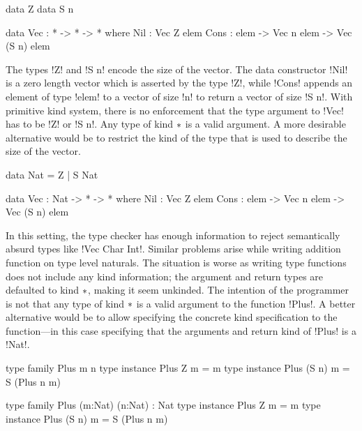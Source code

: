 \documentclass[manuscript,screen,nonacm]{acmart}
\begin{document}
\begin{minipage}[ht]{0.4\linewidth}
  \begin{code}
    data Z
    data S n
  \end{code}
\end{minipage}%
\begin{minipage}[ht]{0.4\linewidth}
\begin{code}
  data Vec : * -> * -> * where
      Nil  : Vec Z elem
      Cons : elem -> Vec n elem -> Vec (S n) elem
\end{code}
\end{minipage}

The types !Z! and !S n! encode the size of the vector. The data constructor !Nil! is a zero length vector which is asserted by the type !Z!, while !Cons! appends an element of type !elem! to a vector of size !n! to return a vector of size !S n!. With primitive kind system, there is no enforcement that the type argument to !Vec! has to be !Z! or !S n!. Any type of kind $\ast$ is a valid argument. A more desirable alternative would be to restrict the kind of the type that is used to describe the size of the vector.

\begin{minipage}[ht]{0.4\linewidth}
  \begin{code}
    data Nat = Z
             | S Nat
  \end{code}
\end{minipage}%
\begin{minipage}[ht]{0.4\linewidth}
\begin{code}
  data Vec : Nat -> * -> * where
      Nil  : Vec Z elem
      Cons : elem -> Vec n elem -> Vec (S n) elem
\end{code}
\end{minipage}

In this setting, the type checker has enough information to reject semantically absurd types like !Vec Char Int!.
Similar problems arise while writing addition function on type level naturals. The situation is worse as writing type functions does not include any kind information; the argument and return types are defaulted to kind $\ast$, making it seem unkinded. The intention of the programmer is not that any type of kind $\ast$ is a valid argument to the function !Plus!. A better alternative would be to allow specifying the concrete kind specification to the function---in this case specifying that the arguments and return kind of !Plus! is a !Nat!.

\begin{minipage}[ht]{0.4\linewidth}
  \begin{code}
    type family Plus m n
    type instance Plus Z m     = m
    type instance Plus (S n) m = S (Plus n m)
  \end{code}
\end{minipage}
\begin{minipage}[ht]{0.4\linewidth}
  \begin{code}
    type family Plus (m:Nat) (n:Nat) : Nat
    type instance Plus Z m     = m
    type instance Plus (S n) m = S (Plus n m)
  \end{code}
\end{minipage}
\end{document}
